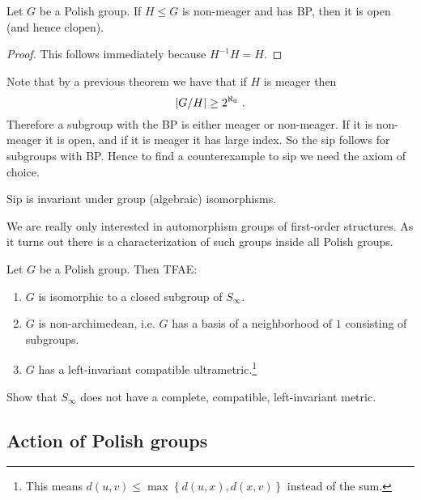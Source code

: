\documentclass{amsart}
\begin{document}
\begin{cor}
Let $G$ be a Polish group. 
If $H\leq G$ is non-meager and has BP, then it is open (and hence clopen).
\end{cor}

\begin{proof}
This follows immediately because $H^{-1} H = H$.
\end{proof}

Note that by a previous theorem %
we have that if $H$ is meager then
\begin{equation}
\abs{G/H}\geq 2^{\aleph_0} \ .
\end{equation}
Therefore a subgroup with the BP is either meager or non-meager. If it is non-meager it is
open, and if it is meager it has large index. So the sip follows for subgroups with BP.
Hence to find a counterexample to sip we need the axiom of choice. 

\begin{exr}
Sip is invariant under group (algebraic) isomorphisms.
\end{exr}

We are really only interested in automorphism groups of first-order structures. 
As it turns out there is a characterization of such groups inside all Polish groups. 

\begin{thm}
Let $G$ be a Polish group. Then TFAE:
\begin{enumerate}[label=(\iii)]
\item $G$ is isomorphic to a closed subgroup of $S_\infty$.
\item $G$ is non-archimedean, i.e. $G$ has a basis of a neighborhood of $1$ consisting of
subgroups. 
\item $G$ has a left-invariant compatible ultrametric.\footnote{This means $d\left( u,v
\right) \leq \max \left\{ d\left( u,x \right) , d\left( x,v \right) \right\}$ instead of
the sum.}
\end{enumerate}
\end{thm}

\begin{exr}
Show that $S_\infty$ does not have a complete, compatible, left-invariant metric. 
\end{exr}

\subsection{Action of Polish groups}
\end{document}
